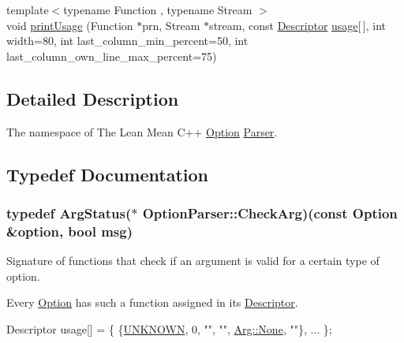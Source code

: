 \begin{DoxyCompactItemize}
\item 
{\footnotesize template$<$typename Function , typename Stream $>$ }\\void \hyperlink{namespace_option_parser_a4dc729b794dd3528f776e41c2d2b5b3e}{print\-Usage} (Function $\ast$prn, Stream $\ast$stream, const \hyperlink{struct_option_parser_1_1_descriptor}{Descriptor} \hyperlink{_selective_community_detection-_x_8cpp_ae4e685e845abde182eb8fc1f87b756ae}{usage}\mbox{[}$\,$\mbox{]}, int width=80, int last\-\_\-column\-\_\-min\-\_\-percent=50, int last\-\_\-column\-\_\-own\-\_\-line\-\_\-max\-\_\-percent=75)
\end{DoxyCompactItemize}


\subsection{Detailed Description}
The namespace of The Lean Mean C++ \hyperlink{class_option_parser_1_1_option}{Option} \hyperlink{class_option_parser_1_1_parser}{Parser}. 

\subsection{Typedef Documentation}
\hypertarget{namespace_option_parser_aee9955553cc70fd9fd41849622680c6a}{
\subsubsection[{Check\-Arg}]{\setlength{\rightskip}{0pt plus 5cm}typedef {\bf Arg\-Status}($\ast$ Option\-Parser\-::\-Check\-Arg)(const {\bf Option} \&option, bool msg)}}\label{namespace_option_parser_aee9955553cc70fd9fd41849622680c6a}


Signature of functions that check if an argument is valid for a certain type of option. 

Every \hyperlink{class_option_parser_1_1_option}{Option} has such a function assigned in its \hyperlink{struct_option_parser_1_1_descriptor}{Descriptor}. 
\begin{DoxyCode}
Descriptor usage[] = \{ \{\hyperlink{_community_detection-_x_8cpp_a0ba79095c558cb72ea2e8b277be1da39a6ce26a62afab55d7606ad4e92428b30c}{UNKNOWN}, 0, \textcolor{stringliteral}{""}, \textcolor{stringliteral}{""}, \hyperlink{struct_option_parser_1_1_arg_afd9e5e7362e4accc619fe7dee7098956}{Arg::None}, \textcolor{stringliteral}{""}\}, ... \};
\end{DoxyCode}


